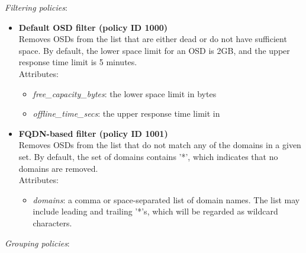 \documentclass[a4paper,10pt]{book}
\begin{document}
\emph{Filtering policies}:
\begin{itemize}

 \item \textbf{Default OSD filter (policy ID 1000)}\\
 Removes OSDs from the list that are either dead or do not have sufficient space. By default, the lower space limit for an OSD is 2GB, and the upper response time limit is 5 minutes.\\

 Attributes:
 \begin{itemize}
 \item \emph{free\_capacity\_bytes}: the lower space limit in bytes
 \item \emph{offline\_time\_secs}: the upper response time limit in
 \end{itemize}

 \item \textbf{FQDN-based filter (policy ID 1001)}\\
 Removes OSDs from the list that do not match any of the domains in a given set. By default, the set of domains contains '*', which indicates that no domains are removed.\\

 Attributes:
 \begin{itemize}
 \item \emph{domains}: a comma or space-separated list of domain names. The list may include leading and trailing '*'s, which will be regarded as wildcard characters.
\end{itemize}

\end{itemize}

\emph{Grouping policies}:
\end{document}
